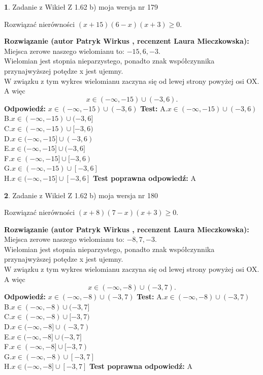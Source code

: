 \documentclass[12pt, a4paper]{article}
\theoremstyle{definition} %
\newtheorem{zad}{}
\newcommand{\zadStart}[1]{\begin{zad}#1\newline}
\newcommand{\zadStop}{\end{zad}}
\newcommand{\rozwStart}[2]{\noindent \textbf{Rozwiązanie (autor #1 , recenzent #2): }\newline}
\newcommand{\rozwStop}{\newline}
\newcommand{\odpStart}{\noindent \textbf{Odpowiedź:}\newline}
\newcommand{\odpStop}{\newline}
\newcommand{\testStart}{\noindent \textbf{Test:}\newline}
\newcommand{\testStop}{\newline}
\newcommand{\kluczStart}{\noindent \textbf{Test poprawna odpowiedź:}\newline}
\newcommand{\kluczStop}{\newline}
\begin{document}
\zadStart{Zadanie z Wikieł Z 1.62 b) moja wersja nr 179}

Rozwiązać nierówności $(x+15)(6-x)(x+3)\ge0$.
\zadStop
\rozwStart{Patryk Wirkus}{Laura Mieczkowska}
Miejsca zerowe naszego wielomianu to: $-15, 6, -3$.\\
Wielomian jest stopnia nieparzystego, ponadto znak współczynnika przy\linebreak najwyższej potędze x jest ujemny.\\ W związku z tym wykres wielomianu zaczyna się od lewej strony powyżej osi OX. A więc $$x \in (-\infty,-15) \cup (-3,6).$$
\rozwStop
\odpStart
$x \in (-\infty,-15) \cup (-3,6)$
\odpStop
\testStart
A.$x \in (-\infty,-15) \cup (-3,6)$\\
B.$x \in (-\infty,-15) \cup (-3,6]$\\
C.$x \in (-\infty,-15) \cup [-3,6)$\\
D.$x \in (-\infty,-15] \cup (-3,6)$\\
E.$x \in (-\infty,-15] \cup (-3,6]$\\
F.$x \in (-\infty,-15] \cup [-3,6)$\\
G.$x \in (-\infty,-15) \cup [-3,6]$\\
H.$x \in (-\infty,-15] \cup [-3,6]$
\testStop
\kluczStart
A
\kluczStop



\zadStart{Zadanie z Wikieł Z 1.62 b) moja wersja nr 180}

Rozwiązać nierówności $(x+8)(7-x)(x+3)\ge0$.
\zadStop
\rozwStart{Patryk Wirkus}{Laura Mieczkowska}
Miejsca zerowe naszego wielomianu to: $-8, 7, -3$.\\
Wielomian jest stopnia nieparzystego, ponadto znak współczynnika przy\linebreak najwyższej potędze x jest ujemny.\\ W związku z tym wykres wielomianu zaczyna się od lewej strony powyżej osi OX. A więc $$x \in (-\infty,-8) \cup (-3,7).$$
\rozwStop
\odpStart
$x \in (-\infty,-8) \cup (-3,7)$
\odpStop
\testStart
A.$x \in (-\infty,-8) \cup (-3,7)$\\
B.$x \in (-\infty,-8) \cup (-3,7]$\\
C.$x \in (-\infty,-8) \cup [-3,7)$\\
D.$x \in (-\infty,-8] \cup (-3,7)$\\
E.$x \in (-\infty,-8] \cup (-3,7]$\\
F.$x \in (-\infty,-8] \cup [-3,7)$\\
G.$x \in (-\infty,-8) \cup [-3,7]$\\
H.$x \in (-\infty,-8] \cup [-3,7]$
\testStop
\kluczStart
A
\kluczStop
\end{document}
